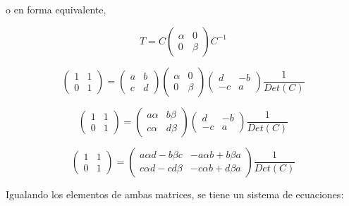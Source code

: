 \bigskip
\noindent
o en forma equivalente,

$$T=C\left(\begin{array}{cc}  \alpha & 0  \\ 0 &  \beta
\end{array}
 \right)C^{-1}$$ 


\bigskip

$$\left(\begin{array}{cc}  1 & 1  \\ 0 &  1
\end{array}
 \right)= \left(\begin{array}{cc}  a & b  \\ c &  d
\end{array}
 \right) \left(\begin{array}{cc}  \alpha & 0  \\0 &  \beta
\end{array}
 \right) \left(\begin{array}{cc}  d & -b  \\ -c &  a
\end{array}
 \right) \frac{1} {Det(C)}$$

\bigskip

$$\left(\begin{array}{cc}  1 & 1  \\ 0 &  1
\end{array}
 \right)= \left(\begin{array}{cc}  a\alpha & b\beta  \\ c\alpha &  d\beta
\end{array}
 \right)  \left(\begin{array}{cc}  d & -b  \\ -c &  a
\end{array}
 \right) \frac{1} {Det(C)}$$
 
\bigskip 


$$\left(\begin{array}{cc}  1 & 1  \\ 0 &  1
\end{array}
 \right)= \left(\begin{array}{cc}  a\alpha d - b\beta c & -a\alpha b + b  \beta a \\ c \alpha d - c d \beta &  -c \alpha b +  d \beta a
\end{array}
 \right)   \frac{1} {Det(C)}$$

\bigskip

Igualando los elementos de ambas matrices, se tiene un sistema de ecuaciones:

